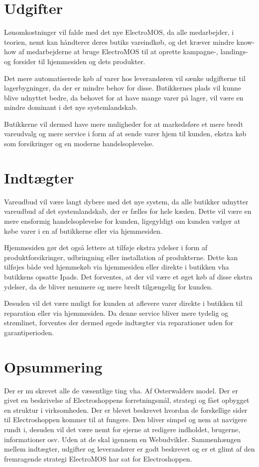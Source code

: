 \section{Udgifter}
Lønomkostninger vil falde med det nye ElectroMOS, da alle medarbejder, i teorien, nemt kan håndterer deres butiks vareindkøb, og det kræver mindre know-how af medarbejderne at bruge ElectroMOS til at oprette kampagne-, landings- og forsider til hjemmesiden og dets produkter.

Det mere automatiserede køb af varer hos leverandøren vil sænke udgifterne til lagerbygninger, da der er mindre behov for disse. Butikkernes plads vil kunne blive udnyttet bedre, da behovet for at have mange varer på lager, vil være en mindre dominant i det nye systemlandskab. 

Butikkerne vil dermed have mere muligheder for at markedsføre et mere bredt vareudvalg og mere service i form af at sende varer hjem til kunden, ekstra køb som forsikringer og en moderne handelsoplevelse. 

\section{Indtægter}
Vareudbud vil være langt dybere med det nye system, da alle butikker udnytter vareudbud af det systemlandskab, der er fælles for hele kæden. Dette vil være en mere ensformig handelsoplevelse for kunden, ligegyldigt om kunden vælger at købe varer i en af butikkerne eller via hjemmesiden.

Hjemmesiden gør det også lettere at tilføje ekstra ydelser i form af produktforsikringer, udbringning eller installation af produkterne. Dette kan tilføjes både ved hjemmekøb via hjemmesiden eller direkte i butikken vha butikkens opsatte Ipads. Det forventes, at der vil være et øget køb af disse ekstra ydelser, da de bliver nemmere og mere bredt tilgængelig for kunden.

Desuden vil det være muligt for kunden at aflevere varer direkte i butikken til reparation eller via hjemmesiden. Da denne service bliver mere tydelig og strømlinet, forventes der dermed øgede indtægter via reparationer uden for garantiperioden.

\section{Opsummering}
Der er nu skrevet alle de væsentlige ting vha. Af Osterwalders model. Der er givet en beskrivelse af Electroshoppens forretningsmål, strategi og fået opbygget en struktur i virksomheden. Der er blevet beskrevet hvordan de forskellige sider til Electroshoppen kommer til at fungere. Den bliver simpel og nem at navigere rundt i, desuden vil det være nemt for ejerne at redigere indholdet, brugerne, informationer osv. Uden at de skal igennem en Webudvikler. Sammenhængen mellem indtægter, udgifter og leverandører er godt beskrevet og er et glimt af den fremragende strategi ElectroMOS har sat for Electroshoppen.